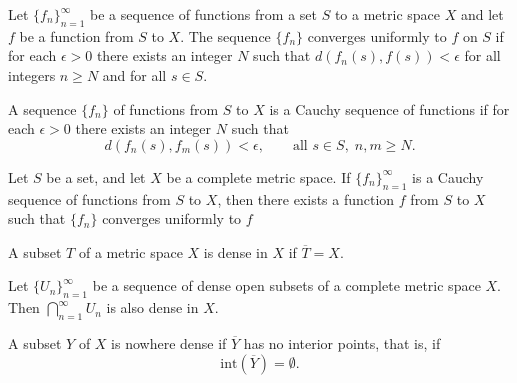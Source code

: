 \documentclass[nobib,notoc]{tufte-handout}
\begin{document}
\begin{defi}
	Let \(\{f_n\}_{n=1}^{\infty}\) be a sequence of functions from a set \(S\) to a metric space \(X\) and let \(f\) be a function from \(S\) to \(X\). The sequence \(\{f_n\}\) converges uniformly to \(f\) on \(S\) if for each \(\epsilon>0\) there exists an integer \(N\) such that \(d(f_n(s),f(s))<\epsilon\) for all integers \(n\geq N\) and for all \(s\in S\).
\end{defi}
\begin{defi}
	A sequence \(\{f_n\}\) of functions from \(S\) to \(X\) is a Cauchy sequence of functions if for each \(\epsilon>0\) there exists an integer \(N\) such that
	\begin{equation*}
		d(f_n(s),f_m(s))<\epsilon,\qquad\text{all }s\in S,\; n,m\geq N.
	\end{equation*}
\end{defi}
\begin{thm}
	Let \(S\) be a set, and let \(X\) be a complete metric space. If \(\{f_n\}_{n=1}^{\infty}\) is a Cauchy sequence of functions from \(S\) to \(X\), then there exists a function \(f\) from \(S\) to \(X\) such that \(\{f_n\}\) converges uniformly to \(f\)
	\begin{IEEEproof}
	\end{IEEEproof}
\end{thm}
\begin{defi}
	A subset \(T\) of a metric space \(X\) is dense in \(X\) if \(\overline{T}=X\).
\end{defi}
\begin{thm}
	Let \(\{U_n\}_{n=1}^{\infty}\) be a sequence of dense open subsets of a complete metric space \(X\). Then \(\bigcap_{n=1}^{\infty}U_n\) is also dense in \(X\).
\end{thm}
\begin{defi}
	A subset \(Y\) of \(X\) is nowhere dense if \(\overline{Y}\) has no interior points, that is, if
	\begin{equation*}
		\text{int}(\overline{Y})=\emptyset.
	\end{equation*}
\end{defi}
\end{document}
